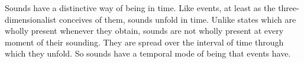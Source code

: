 \documentclass[12pt]{article}
\begin{document}
Sounds have a distinctive way of being in time. Like events, at least as the three-dimensionalist conceives of them, sounds unfold in time. Unlike states which are wholly present whenever they obtain, sounds are not wholly present at every moment of their sounding. They are spread over the interval of time through which they unfold. So sounds have a temporal mode of being that events have. 


\end{document}
